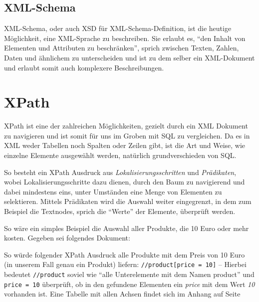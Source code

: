 \subsection{XML-Schema}
XML-Schema, oder auch XSD für XML-Schema-Definition, ist die heutige
Möglichkeit, eine XML-Sprache zu beschreiben. Sie erlaubt es,
\enquote{den Inhalt von Elementen und Attributen zu
  beschränken}\cite{wiki:de:xml}, sprich zwischen Texten, Zahlen,
Daten und ähnlichem zu unterscheiden und ist zu dem selber ein
XML-Dokument und erlaubt somit auch komplexere Beschreibungen.

\section{XPath}\label{xpath}
XPath ist eine der zahlreichen Möglichkeiten, gezielt durch ein XML
Dokument zu navigieren und ist somit für uns im Groben mit SQL zu
vergleichen. Da es in XML weder Tabellen noch Spalten oder Zeilen
gibt, ist die Art und Weise, wie einzelne Elemente ausgewählt werden,
natürlich grundverschieden von SQL.

So besteht ein XPath Ausdruck aus {\em Lokalisierungsschritten} und
{\em Prädikaten}, wobei Lokalisierungsschritte dazu dienen, durch den
Baum zu navigierend und dabei mindestens eins, unter Umständen eine
Menge von Elementen zu selektieren. Mittels Prädikaten wird die
Auswahl weiter eingegrenzt, in dem zum Beispiel die Textnodes, sprich
die "`Werte"' der Elemente, überprüft werden.

So wäre ein simples Beispiel die Auswahl aller Produkte, die 10 Euro
oder mehr kosten. Gegeben sei folgendes Dokument:




\lstset{language=XSLT}

So würde folgender XPath Ausdruck alle Produkte mit dem Preis von 10
Euro (in unserem Fall genau ein Produkt) liefern:
\lstinline{//product[price = 10]} -- Hierbei bedeutet
\lstinline{//product} soviel wie "`alle Unterelemente mit dem Namen
product"' und \lstinline{price = 10} überprüft, ob in den gefundene
Elementen ein {\em price} mit dem Wert {\em 10} vorhanden ist.
Eine Tabelle mit allen Achsen findet sich im Anhang auf Seite \pageref{table-axes}

